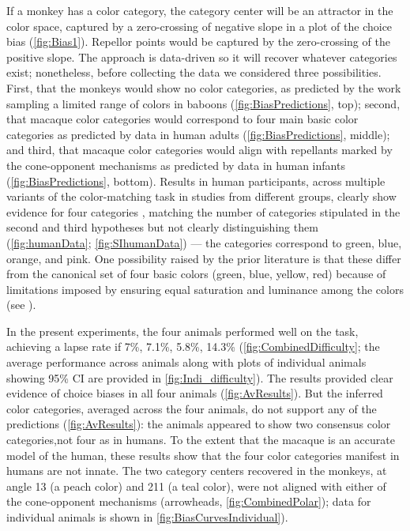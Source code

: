 If a monkey has a color category, the category center will be an attractor in the color space, captured by a zero-crossing of negative slope in a plot of the choice bias (\autoref{fig:Bias1}). 
Repellor points would be captured by the zero-crossing of the positive slope.
The approach is data-driven so it will recover whatever categories exist; nonetheless, before collecting the data we considered three possibilities. 
First, that the monkeys would show no color categories, as predicted by the work sampling a limited range of colors in baboons \citep{davidoff_cross-species_2010}
(\autoref{fig:BiasPredictions}, top);
second, that macaque color categories would correspond to  four main basic color categories as predicted by data in human adults (\autoref{fig:BiasPredictions}, middle); 
and third, that macaque color categories would align with repellants marked by the cone-opponent mechanisms as predicted by data in human infants \citep{skelton_biological_2017} (\autoref{fig:BiasPredictions}, bottom). 
Results in human participants, across multiple variants of the color-matching task in studies from different groups, clearly show evidence for four categories \citep{bae_why_2015,panichello_error-correcting_2019}, matching the number of categories stipulated in the second and third hypotheses but not clearly distinguishing them (\autoref{fig:humanData}; \autoref{fig:SIhumanData}) — the categories correspond to green, blue, orange, and pink. 
One possibility raised by the prior literature is that these differ from the canonical set of four basic colors (green, blue, yellow, red) because of limitations imposed by ensuring equal saturation and luminance among the colors (see \citep{bae_why_2015}). 

In the present experiments, the four animals performed well on the task, achieving a lapse rate if 7\%, 7.1\%, 5.8\%, 14.3\% (\autoref{fig:CombinedDifficulty}; the average performance across animals along with plots of individual animals showing 95\% CI are provided in \autoref{fig:Indi_difficulty}). %
The results provided clear evidence of choice biases in all four animals (\autoref{fig:AvResults}).
But the inferred color categories, averaged across the four animals, do not support any of the predictions (\autoref{fig:AvResults}): the animals appeared to show two consensus color categories,not four as in humans. 
To the extent that the macaque is an accurate model of the human, these results show that the four color categories manifest in humans are not innate. 
The two category centers recovered in the monkeys, at angle 13 (a peach color) and 211 (a teal color), were not  aligned with either of the cone-opponent mechanisms (arrowheads, \autoref{fig:CombinedPolar}); data for individual animals is shown in \autoref{fig:BiasCurvesIndividual}).

